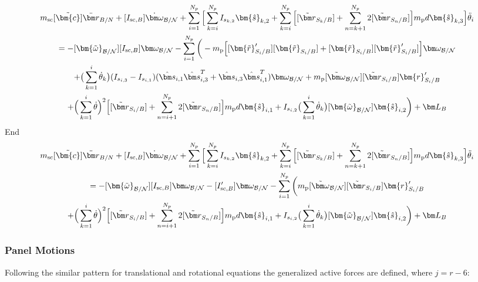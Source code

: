 \begin{multline}
	m_{\text{sc}}[\tilde{\bm{c}}]\ddot{\bm r}_{B/N} + [I_{\text{sc},B}] \dot{\bm\omega}_{\cal B/N} + \sum\limits_{i=1}^{N_p} \Big[\sum^{N_p}_{k=i}I_{s_{k,2}} \bm{\hat{s}}_{k,2} + \sum\limits_{k=i}^{N_p}\Big[ [\tilde{{\bm r}}_{S_{k}/B}] + \sum\limits_{n=k+1}^{N_p}2[\tilde{{\bm r}}_{S_{n}/B}]\Big]m_{\text{p}} d \bm{\hat{s}}_{k,3} \Big] \ddot{\theta}_i
	\\
	= -[\bm{\tilde{\omega}}_{\cal B/N}] [I_{\text{sc},B}] \bm\omega_{\cal B/N} - \sum\limits_{i=1}^{N_p}\bigg( - m_{\text{p}}\Big[[\bm{\tilde{r}}'_{S_i/B}] [\bm{\tilde{r}}_{S_i/B}] + [\bm{\tilde{r}}_{S_i/B}] [\bm{\tilde{r}}'_{S_i/B}]\Big] \bm\omega_{\cal B/N} \\
	+\big(\sum^{i}_{k=1}\dot{\theta}_k\big)(I_{s_{i,3}}-I_{s_{i,1}})(\hat{\bm s}_{i,1}\hat{\bm s}_{i,3}^{T}+\hat{\bm s}_{i,3}\hat{\bm s}_{i,1}^{T}) \bm\omega_{\cal B/N}
	+ m_{\text{p}} [\tilde{\bm\omega}_{\cal B/N}] [\tilde{{\bm r}}_{S_{i}/B}] \bm{r}'_{S_i/B} \\
	+ \Big( \sum\limits_{k=1}^{i} \dot{\theta}\Big)^2 \Big[[\tilde{{\bm r}}_{S_{i}/B}]
	+ \sum\limits_{n=i+1}^{N_p}2[\tilde{{\bm r}}_{S_{n}/B}]\Big] m_{\text{p}} d \bm{\hat{s}}_{i,1}
	+ I_{s_{i,2}} \big(\sum^{i}_{k=1}\dot{\theta}_k\big) [\bm{\tilde{\omega}}_{\cal B/N}] \bm{\hat{s}}_{i,2} \bigg) + \bm L_B
\end{multline}
End
\begin{multline}
	m_{\text{sc}}[\tilde{\bm{c}}]\ddot{\bm r}_{B/N} + [I_{\text{sc},B}] \dot{\bm\omega}_{\cal B/N} + \sum\limits_{i=1}^{N_p} \Big[\sum^{N_p}_{k=i}I_{s_{k,2}} \bm{\hat{s}}_{k,2} + \sum\limits_{k=i}^{N_p}\Big[ [\tilde{{\bm r}}_{S_{k}/B}] + \sum\limits_{n=k+1}^{N_p}2[\tilde{{\bm r}}_{S_{n}/B}]\Big]m_{\text{p}} d \bm{\hat{s}}_{k,3} \Big] \ddot{\theta}_i
	\\
	= -[\bm{\tilde{\omega}}_{\cal B/N}] [I_{\text{sc},B}] \bm\omega_{\cal B/N} - [I'_{\text{sc},B}] \bm\omega_{\cal B/N} - \sum\limits_{i=1}^{N_p}\bigg( m_{\text{p}} [\tilde{\bm\omega}_{\cal B/N}] [\tilde{{\bm r}}_{S_{i}/B}] \bm{r}'_{S_i/B} \\
	+ \Big( \sum\limits_{k=1}^{i} \dot{\theta}\Big)^2 \Big[[\tilde{{\bm r}}_{S_{i}/B}] + \sum\limits_{n=i+1}^{N_p}2[\tilde{{\bm r}}_{S_{n}/B}]\Big] m_{\text{p}} d \bm{\hat{s}}_{i,1}
	+ I_{s_{i,2}} \big(\sum^{i}_{k=1}\dot{\theta}_k\big) [\bm{\tilde{\omega}}_{\cal B/N}] \bm{\hat{s}}_{i,2} \bigg) + \bm L_B
	\label{eq:rotmot}
\end{multline}

\subsubsection{Panel Motions}
Following the similar pattern for translational and rotational equations the generalized active forces are defined, where $j=r-6$:

